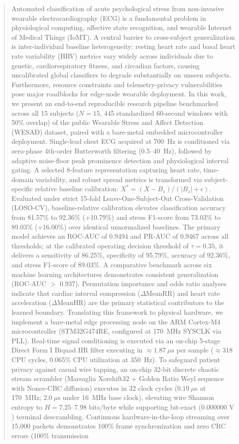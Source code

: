 \documentclass[conference]{IEEEtran}
\begin{document}
\begin{abstract}
Automated classification of acute psychological stress from non-invasive wearable electrocardiography (ECG) is a fundamental problem in physiological computing, affective state recognition, and wearable Internet of Medical Things (IoMT). A central barrier to cross-subject generalization is inter-individual baseline heterogeneity: resting heart rate and basal heart rate variability (HRV) metrics vary widely across individuals due to genetic, cardiorespiratory fitness, and circadian factors, causing uncalibrated global classifiers to degrade substantially on unseen subjects. Furthermore, resource constraints and telemetry-privacy vulnerabilities pose major roadblocks for edge-node wearable deployment. In this work, we present an end-to-end reproducible research pipeline benchmarked across all 15 subjects ($N=15$, 445 standardized 60-second windows with 50\% overlap) of the public Wearable Stress and Affect Detection (WESAD) dataset, paired with a bare-metal embedded microcontroller deployment. Single-lead chest ECG acquired at 700~Hz is conditioned via zero-phase 4th-order Butterworth filtering (0.5--40~Hz), followed by adaptive noise-floor peak prominence detection and physiological interval gating. A selected 8-feature representation capturing heart rate, time-domain variability, and robust spread metrics is transformed via subject-specific relative baseline calibration: $X^* = (X - B_s) / (|B_s| + \epsilon)$. Evaluated under strict 15-fold Leave-One-Subject-Out Cross-Validation (LOSO-CV), baseline-relative calibration elevates classification accuracy from 81.57\% to 92.36\% (+10.79\%) and stress F1-score from 73.03\% to 89.03\% (+16.00\%) over identical unnormalized baselines. The primary model achieves an ROC-AUC of 0.9494 and PR-AUC of 0.9467 across all thresholds; at the calibrated operating decision threshold of $\tau = 0.35$, it delivers a sensitivity of 86.25\%, specificity of 95.79\%, accuracy of 92.36\%, and stress F1-score of 89.03\%. A comparative benchmark across six machine learning architectures demonstrates consistent generalization (ROC-AUC $>$ 0.937). Permutation importance and odds ratio analyses indicate that cardiac interval compression ($\Delta\text{MeanRR}$) and heart rate acceleration ($\Delta\text{MeanHR}$) are the primary statistical contributors to the learned boundary. Translating this framework to physical hardware, we implement a bare-metal edge processing node on the ARM Cortex-M4 microcontroller (STM32G474RE, configured at 170~MHz SYSCLK via PLL). Real-time signal conditioning is executed via an on-chip 5-stage Direct Form I Biquad IIR filter executing in $\approx 1.87~\mu\text{s}$ per sample ($\approx 318$ CPU cycles, 0.065\% CPU utilization at 350~Hz). To safeguard patient privacy against casual wire tapping, an on-chip 32-bit discrete chaotic stream scrambler (Marsaglia Xorshift32 + Golden Ratio Weyl sequence with Nonce-CBC diffusion) executes in 32 clock cycles ($0.19~\mu\text{s}$ at 170~MHz; $2.0~\mu\text{s}$ under 16~MHz base clock), elevating wire Shannon entropy to $H = 7.25\text{--}7.98\text{ bits/byte}$ while supporting bit-exact ($0.000000\text{ V}$) terminal descrambling. Continuous hardware-in-the-loop streaming over 15,000 packets demonstrates 100\% frame synchronization and zero CRC errors (100\% transmission 
\end{abstract}
\end{document}

